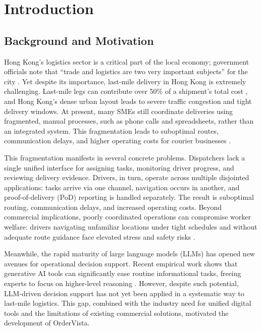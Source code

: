 \chapter{Introduction}
\label{ch:introduction}

\section{Background and Motivation}
\label{sec:background}

Hong Kong's logistics sector is a critical part of the local economy; government
officials note that ``trade and logistics are two very important subjects'' for
the city \autocite{tlb2025logistics}.  Yet despite its importance, last-mile
delivery in Hong Kong is extremely challenging.  Last-mile legs can contribute
over 50\% of a shipment's total cost \autocite{fedex2025lastmile}, and Hong
Kong's dense urban layout leads to severe traffic congestion and tight delivery
windows.  At present, many SMEs still coordinate deliveries using fragmented,
manual processes, such as phone calls and spreadsheets, rather than an integrated
system.  This fragmentation leads to suboptimal routes, communication delays,
and higher operating costs for courier businesses
\autocite{bhattacharjee2024digitizing}.

This fragmentation manifests in several concrete problems. Dispatchers lack a single unified interface for assigning tasks, monitoring driver progress, and reviewing delivery evidence. Drivers, in turn, operate across multiple disjointed applications: tasks arrive via one channel, navigation occurs in another, and proof-of-delivery (PoD) reporting is handled separately. The result is suboptimal routing, communication delays, and increased operating costs. Beyond commercial implications, poorly coordinated operations can compromise worker welfare: drivers navigating unfamiliar locations under tight schedules and without adequate route guidance face elevated stress and safety risks \autocite{apdullah2021occupational}.

Meanwhile, the rapid maturity of large language models (LLMs) has opened new avenues for operational decision support.  Recent empirical work shows that generative AI tools can significantly ease routine informational tasks, freeing experts to focus on higher-level reasoning \autocite{brynjolfsson2023generative}.  However, despite such potential, LLM-driven decision support has not yet been applied in a systematic way to last-mile logistics.  This gap, combined with the industry need for unified digital tools and the limitations of existing commercial solutions, motivated the development of OrderVista.

